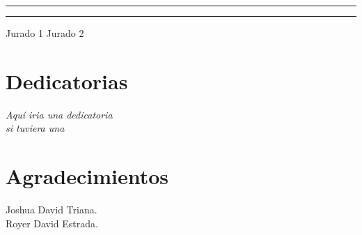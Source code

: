 \documentclass[12pt,letterpaper,openany]{book}
\begin{document}
\vspace*{1.3in}
\rule{60mm}{0.1mm} \hfill \rule{60mm}{0.1mm} \newline
Jurado 1 \hfill Jurado 2

\chapter*{Dedicatorias}
\begin{flushright}
\textit{Aquí iria una dedicatoria \\
si tuviera una}
\end{flushright}

\chapter*{Agradecimientos} %
 
Joshua David Triana. \\
Royer David Estrada.
\newpage
{}
\tableofcontents %
\end{document}
